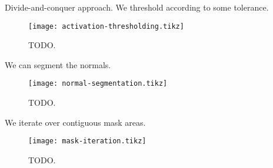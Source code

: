 Divide-and-conquer approach.
We threshold according to some tolerance.

\begin{figure}[H]
  \centering
  \texttt{[image: activation-thresholding.tikz]}
  \caption{TODO.}
\end{figure}

We can segment the normals.

\begin{figure}[H]
  \centering
  \texttt{[image: normal-segmentation.tikz]}
  \caption{TODO.}
\end{figure}

We iterate over contiguous mask areas.

\begin{figure}[H]
  \centering
  \texttt{[image: mask-iteration.tikz]}
  \caption{TODO.}
\end{figure}
